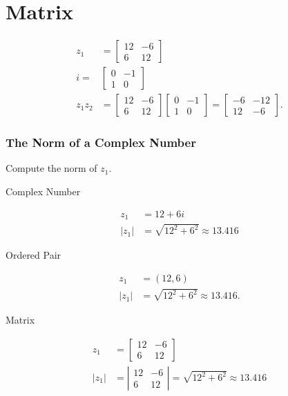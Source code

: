 \documentclass[10pt]{article}
\begin{document}
\section{Matrix}
$$
\begin{aligned}
z_{1} & =\left[\begin{array}{cc}
12 & -6 \\
6 & 12
\end{array}\right] \\
i= & {\left[\begin{array}{cc}
0 & -1 \\
1 & 0
\end{array}\right] } \\
z_{1} z_{2} & =\left[\begin{array}{cc}
12 & -6 \\
6 & 12
\end{array}\right]\left[\begin{array}{cc}
0 & -1 \\
1 & 0
\end{array}\right]=\left[\begin{array}{cc}
-6 & -12 \\
12 & -6
\end{array}\right] .
\end{aligned}
$$

\subsubsection{The Norm of a Complex Number}
Compute the norm of $z_{1}$.

Complex Number

$$
\begin{aligned}
z_{1} & =12+6 i \\
\left|z_{1}\right| & =\sqrt{12^{2}+6^{2}} \approx 13.416
\end{aligned}
$$

Ordered Pair

$$
\begin{aligned}
z_{1} & =(12,6) \\
\left|z_{1}\right| & =\sqrt{12^{2}+6^{2}} \approx 13.416 .
\end{aligned}
$$

Matrix

$$
\begin{aligned}
z_{1} & =\left[\begin{array}{cc}
12 & -6 \\
6 & 12
\end{array}\right] \\
\left|z_{1}\right| & =\left|\begin{array}{cc}
12 & -6 \\
6 & 12
\end{array}\right|=\sqrt{12^{2}+6^{2}} \approx 13.416
\end{aligned}
$$
\end{document}

